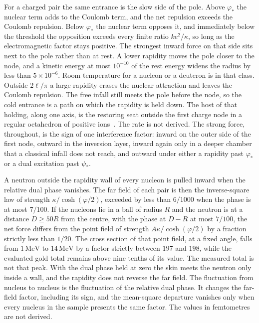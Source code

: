 \documentclass[a4paper]{article}
\begin{document}
For a charged pair the same entrance is the slow side of the pole. Above \(\varphi_*\) the nuclear term adds to the Coulomb term, and the net repulsion exceeds the Coulomb repulsion. Below \(\varphi_*\) the nuclear term opposes it, and immediately below the threshold the opposition exceeds every finite ratio \(k e^{2}/\kappa\), so long as the electromagnetic factor stays positive. The strongest inward force on that side sits next to the pole rather than at rest. A lower rapidity moves the pole closer to the node, and a kinetic energy at most \(10^{-10}\) of the rest energy widens the radius by less than \(5\times 10^{-6}\). Room temperature for a nucleon or a deuteron is in that class. Outside \(2\ell/\pi\) a large rapidity erases the nuclear attraction and leaves the Coulomb repulsion. The free infall still meets the pole before the node, so the cold entrance is a path on which the rapidity is held down. The host of that holding, along one axis, is the restoring seat outside the first charge node in a regular octahedron of positive ions~\cite{dst-cold}. The rate is not derived. The strong force, throughout, is the sign of one interference factor: inward on the outer side of the first node, outward in the inversion layer, inward again only in a deeper chamber that a classical infall does not reach, and outward under either a rapidity past \(\varphi_*\) or a dual excitation past \(\psi_*\).

A neutron outside the rapidity wall of every nucleon is pulled inward when the relative dual phase vanishes. The far field of each pair is then the inverse-square law of strength \(\kappa/\cosh(\varphi/2)\), exceeded by less than \(6/1000\) when the phase is at most \(7/100\). If the nucleons lie in a ball of radius \(R\) and the neutron is at a distance \(D\ge 50R\) from the centre, with the phase at \(D-R\) at most \(7/100\), the net force differs from the point field of strength \(A\kappa/\cosh(\varphi/2)\) by a fraction strictly less than \(1/20\). The cross section of that point field, at a fixed angle, falls from \(1\,\mathrm{MeV}\) to \(14\,\mathrm{MeV}\) by a factor strictly between \(197\) and \(198\), while the evaluated gold total remains above nine tenths of its value. The measured total is not that peak. With the dual phase held at zero the skin meets the neutron only inside a wall, and the rapidity does not reverse the far field. The fluctuation from nucleus to nucleus is the fluctuation of the relative dual phase. It changes the far-field factor, including its sign, and the mean-square departure vanishes only when every nucleus in the sample presents the same factor. The values in femtometres are not derived.
\end{document}
